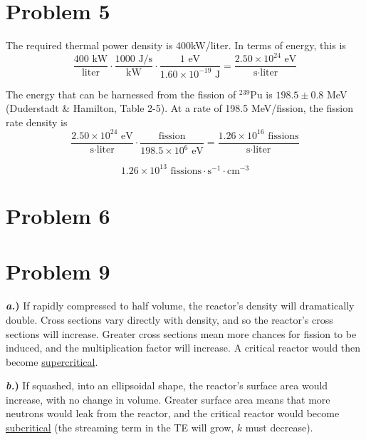 \documentclass{article}
\begin{document}

\section*{Problem 5}

The required thermal power density is 400kW/liter. In terms of energy, this is 
$$ \frac{400\text{ kW}}{\text{liter}} \cdot \frac{1000 \text{ J/s}}{\text{kW}} \cdot \frac{1 \text{ eV}}{1.60 \times 10^{-19} \text{ J}} = \frac{2.50 \times 10^{24} \text{ eV}}{\text{s} \cdot \text{liter}} $$

The energy that can be harnessed from the fission of $^{239}$Pu is $198.5 \pm 0.8$ MeV (Duderstadt \& Hamilton, Table 2-5). At a rate of 198.5 MeV/fission, the fission rate density is 
$$ \frac{2.50 \times 10^{24} \text{ eV}}{\text{s} \cdot \text{liter}} \cdot \frac{\text{fission}}{198.5 \times 10^6 \text{ eV}} = \frac{1.26 \times 10^{16} \text{ fissions}}{\text{s} \cdot \text{liter}} $$

$$\boxed{ 1.26 \times 10^{13} \text{ fissions} \cdot \text{s}^{-1} \cdot \text{cm}^{-3} }$$




\section*{Problem 6}





\section*{Problem 9}

\textbf{\textit{a.})} If rapidly compressed to half volume, the reactor's density will dramatically double. Cross sections vary directly with density, and so the reactor's cross sections will increase. Greater cross sections mean more chances for fission to be induced, and the multiplication factor will increase. A critical reactor would then become \underline{supercritical}.

\textbf{\textit{b.})} If squashed, into an ellipsoidal shape, the reactor's surface area would increase, with no change in volume. Greater surface area means that more neutrons would leak from the reactor, and the critical reactor would become \underline{subcritical} (the streaming term in the TE will grow, $k$ must decrease).
\end{document}
